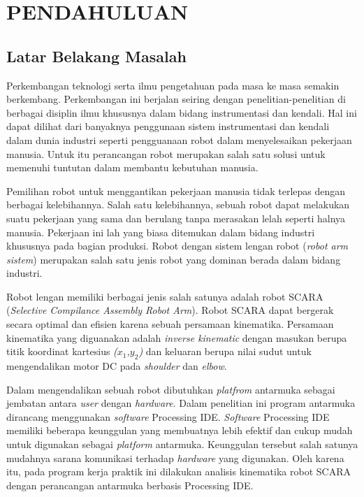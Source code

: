 
\chapter{PENDAHULUAN}

\section{Latar Belakang Masalah}

	Perkembangan teknologi serta ilmu pengetahuan pada masa ke masa semakin berkembang. Perkembangan ini berjalan seiring dengan penelitian-penelitian di berbagai disiplin ilmu khususnya dalam bidang instrumentasi dan kendali. Hal ini dapat dilihat dari banyaknya penggunaan sistem instrumentasi dan kendali dalam dunia industri seperti pengguanaan robot dalam menyelesaikan pekerjaan manusia. Untuk itu perancangan robot merupakan salah satu solusi untuk memenuhi tuntutan dalam membantu kebutuhan manusia.
	
	Pemilihan robot untuk menggantikan pekerjaan manusia tidak terlepas dengan berbagai kelebihannya. Salah satu kelebihannya, sebuah robot dapat melakukan suatu pekerjaan yang sama dan berulang tanpa merasakan lelah seperti halnya manusia. Pekerjaan ini lah yang biasa ditemukan dalam bidang industri khususnya pada bagian produksi. Robot dengan sistem lengan robot (\emph {robot arm sistem}) merupakan salah satu jenis robot yang dominan berada dalam bidang industri. 
	
	Robot lengan memiliki berbagai jenis salah satunya adalah robot SCARA (\emph{Selective Compilance Assembly Robot Arm}). Robot SCARA dapat bergerak secara optimal dan efisien karena sebuah persamaan kinematika. Persamaan kinematika yang diguanakan adalah \textit{inverse kinematic} dengan masukan berupa titik koordinat kartesius \textit{($x_{1}$,$y_{2}$)} dan keluaran berupa nilai sudut untuk mengendalikan motor DC pada \textit{shoulder} dan \textit{elbow}.
	
	Dalam mengendalikan sebuah robot dibutuhkan \textit{platfrom} antarmuka sebagai jembatan antara \textit{user} dengan \emph{hardware}. Dalam penelitian ini program antarmuka dirancang menggunakan \textit{software} Processing IDE. \emph{Software} Processing IDE memiliki beberapa keunggulan yang membuatnya lebih efektif dan cukup mudah untuk digunakan sebagai \textit{platform} antarmuka. Keunggulan tersebut salah satunya mudahnya sarana komunikasi terhadap \emph {hardware} yang digunakan. Oleh karena itu, pada program kerja praktik ini dilakukan analisis kinematika robot SCARA dengan perancangan antarmuka berbasis  Processing IDE.\\


